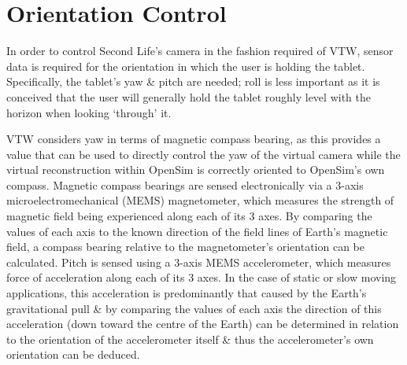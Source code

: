 

\section{Orientation Control}

\newcommand{\ArduinoFootnote}{\footnote{\url{http://www.arduino.cc/}}}

\newcommand{\MMAfootnote}{\footnote{\url{http://cache.freescale.com/files/sensors/doc/data_sheet/MMA8452Q.pdf}}}

\newcommand{\ADXLfootnote}{\footnote{\url{http://www.analog.com/static/imported-files/data_sheets/ADXL335.pdf}}}

\newcommand{\HMCfootnote}{\footnote{\url{http://www51.honeywell.com/aero/common/documents/myaerospacecatalog-documents/Defense_Brochures-documents/HMC5883L_3-Axis_Digital_Compass_IC.pdf}}}

\newcommand{\HMCtwoFootnote}{\footnote{\url{http://www51.honeywell.com/aero/common/documents/myaerospacecatalog-documents/Missiles-Munitions/HMC6343.pdf}}}


In order to control Second Life's camera in the fashion required of VTW, sensor data is required for the orientation in which the user is holding the tablet. Specifically, the tablet's yaw \& pitch are needed; roll is less important as it is conceived that the user will generally hold the tablet roughly level with the horizon when looking `through' it.

VTW considers yaw in terms of magnetic compass bearing, as this provides a value that can be used to directly control the yaw of the virtual camera while the virtual reconstruction within OpenSim is correctly oriented to OpenSim's own compass. Magnetic compass bearings are sensed electronically via a 3-axis microelectromechanical (MEMS) magnetometer, which measures the strength of magnetic field being experienced along each of its 3 axes. By comparing the values of each axis to the known direction of the field lines of Earth's magnetic field, a compass bearing relative to the magnetometer's orientation can be calculated. Pitch is sensed using a 3-axis MEMS accelerometer, which measures force of acceleration along each of its 3 axes. In the case of static or slow moving applications, this acceleration is predominantly that caused by the Earth's gravitational pull \& by comparing the values of each axis the direction of this acceleration (down toward the centre of the Earth) can be determined in relation to the orientation of the accelerometer itself \& thus the accelerometer's own orientation can be deduced.

